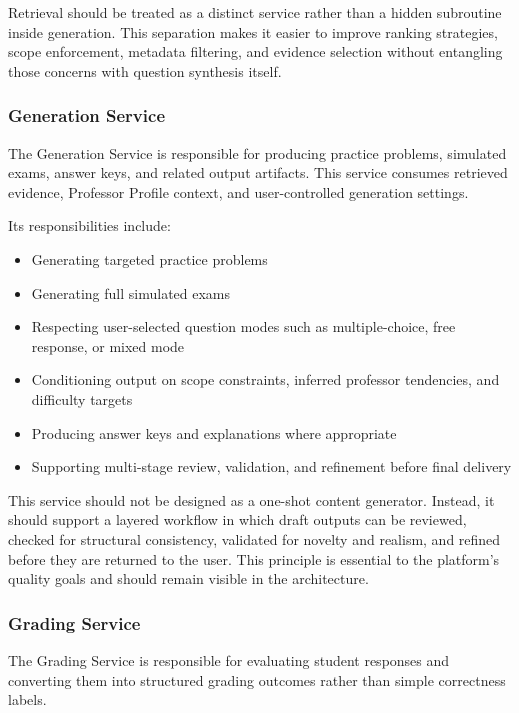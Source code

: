 \documentclass[11pt]{article}
\begin{document}
Retrieval should be treated as a distinct service rather than a hidden subroutine inside generation. This separation makes it easier to improve ranking strategies, scope enforcement, metadata filtering, and evidence selection without entangling those concerns with question synthesis itself.

\subsubsection{Generation Service}
The Generation Service is responsible for producing practice problems, simulated exams, answer keys, and related output artifacts. This service consumes retrieved evidence, Professor Profile context, and user-controlled generation settings.

Its responsibilities include:
\begin{itemize}
\item Generating targeted practice problems
\item Generating full simulated exams
\item Respecting user-selected question modes such as multiple-choice, free response, or mixed mode
\item Conditioning output on scope constraints, inferred professor tendencies, and difficulty targets
\item Producing answer keys and explanations where appropriate
\item Supporting multi-stage review, validation, and refinement before final delivery
\end{itemize}

This service should not be designed as a one-shot content generator. Instead, it should support a layered workflow in which draft outputs can be reviewed, checked for structural consistency, validated for novelty and realism, and refined before they are returned to the user. This principle is essential to the platform's quality goals and should remain visible in the architecture.

\subsubsection{Grading Service}
The Grading Service is responsible for evaluating student responses and converting them into structured grading outcomes rather than simple correctness labels.
\end{document}
